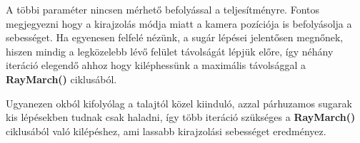 A többi paraméter nincsen mérhető befolyással a teljesítményre. Fontos megjegyezni hogy a kirajzolás módja miatt a kamera pozíciója is befolyásolja a sebességet. Ha egyenesen felfelé nézünk, a sugár lépései jelentősen megnőnek, hiszen mindig a legközelebb lévő felület távolságát lépjük előre, így néhány iteráció elegendő ahhoz hogy kiléphessünk a maximális távolsággal a \textbf{RayMarch()} ciklusából.

Ugyanezen okból kifolyólag a talajtól közel kiinduló, azzal párhuzamos sugarak kis lépésekben tudnak csak haladni, így több iteráció szükséges a \textbf{RayMarch()} ciklusából való kilépéshez, ami lassabb kirajzolási sebességet eredményez.